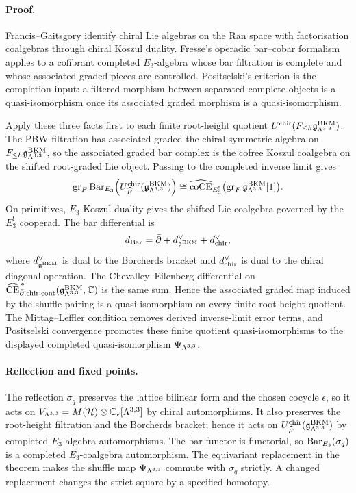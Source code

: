 \paragraph{Proof.}
Francis--Gaitsgory identify chiral Lie algebras on the Ran space with
factorisation coalgebras through chiral Koszul duality.  Fresse's
operadic bar--cobar formalism applies to a cofibrant completed
$E_3$-algebra whose bar filtration is complete and whose associated
graded pieces are controlled.  Positselski's criterion is the
completion input: a filtered morphism between separated complete
objects is a quasi-isomorphism once its associated graded morphism is a
quasi-isomorphism.

Apply these three facts first to each finite root-height quotient
$U^{\chir}(F_{\leq h}\gBKM_{\Lat^{3,3}})$.  The PBW filtration has
associated graded the chiral symmetric algebra on
$F_{\leq h}\gBKM_{\Lat^{3,3}}$, so the associated graded bar complex is
the cofree Koszul coalgebra on the shifted root-graded Lie object.
Passing to the completed inverse limit gives
\[
  \operatorname{gr}_F
  \Bar_{E_3}
  \!\left(U^{\chir}_{\widehat F}(\gBKM_{\Lat^{3,3}})\right)
  \cong
  \widehat{\coCE}_{E_3^!}
  \bigl(\operatorname{gr}_F\gBKM_{\Lat^{3,3}}[1]\bigr).
\]
On primitives, $E_3$-Koszul duality gives the shifted Lie coalgebra
governed by the $E_3^!$ cooperad.  The bar differential is
\[
  d_{\Bar}=\dbar+d_{\gBKM}^{\vee}+d_{\chir}^{\vee},
\]
where $d_{\gBKM}^{\vee}$ is dual to the Borcherds bracket and
$d_{\chir}^{\vee}$ is dual to the chiral diagonal operation.  The
Chevalley--Eilenberg differential on
$\widehat{\CE}^{\,*}_{\dbar,\chir,\mathrm{cont}}
(\gBKM_{\Lat^{3,3}},\C)$ is the same sum.  Hence the associated graded
map induced by the shuffle pairing is a quasi-isomorphism on every
finite root-height quotient.  The Mittag--Leffler condition removes
derived inverse-limit error terms, and Positselski convergence promotes
these finite quotient quasi-isomorphisms to the displayed completed
quasi-isomorphism $\Psi_{\Lat^{3,3}}$.

\paragraph{Reflection and fixed points.}
The reflection $\sigma_q$ preserves the lattice bilinear form and the
chosen cocycle $\epsilon$, so it acts on
$V_{\Lat^{3,3}}=M(\cH)\otimes\C_\epsilon[\Lat^{3,3}]$ by chiral
automorphisms.  It also preserves the root-height filtration and the
Borcherds bracket; hence it acts on
$U^{\chir}_{\widehat F}(\gBKM_{\Lat^{3,3}})$ by completed
$E_3$-algebra automorphisms.  The bar functor is functorial, so
$\Bar_{E_3}(\sigma_q)$ is a completed $E_3^!$-coalgebra automorphism.
The equivariant replacement in the theorem makes the shuffle map
$\Psi_{\Lat^{3,3}}$ commute with $\sigma_q$ strictly.  A changed
replacement changes the strict square by a specified homotopy.

